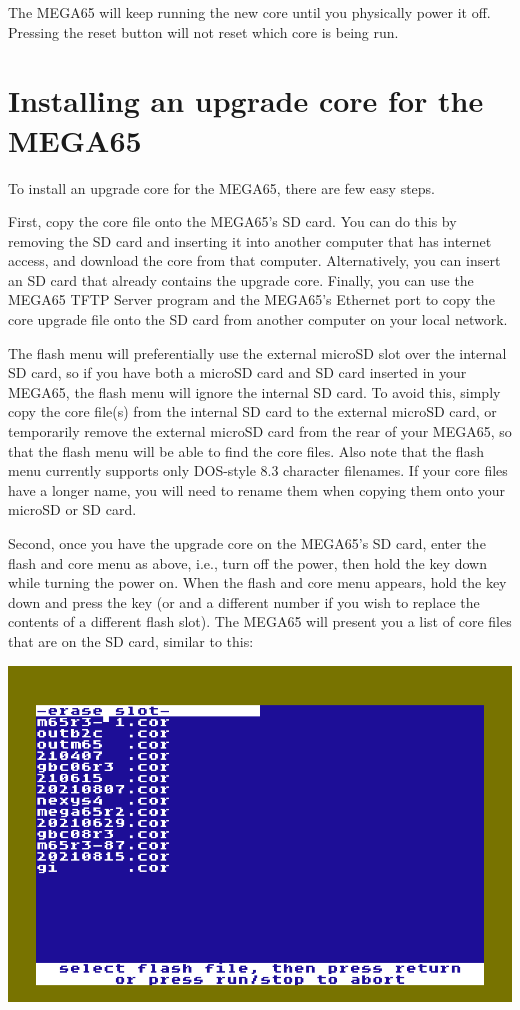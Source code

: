 The MEGA65 will keep running the new core until you physically power it off.  Pressing the reset button
will not reset which core is being run.

\section{Installing an upgrade core for the MEGA65}

To install an upgrade core for the MEGA65, there are few easy steps.

First, copy the core file onto the MEGA65's SD card.  You can do this by removing the SD card and inserting
it into another computer that has internet access, and download the core from that computer. Alternatively,
you can insert an SD card that already contains the upgrade core. Finally, you can use the MEGA65 TFTP Server
program and the MEGA65's Ethernet port to copy the core upgrade file onto the SD card from another computer
on your local network.

The flash menu will preferentially use the external microSD slot over
the internal SD card, so if you have both a microSD card and SD card
inserted in your MEGA65, the flash menu will ignore the
internal SD card. To avoid this, simply copy the core file(s) from the internal SD
card to the external microSD card, or temporarily remove the external
microSD card from the rear of your MEGA65, so that the flash menu will
be able to find the core files.  Also note that the flash menu
currently supports only DOS-style 8.3 character filenames. If your
core files have a longer name, you will need to rename them when
copying them onto your microSD or SD card.

Second, once you have the upgrade core on the MEGA65's SD card, enter the flash and core menu as above,
i.e., turn off the power, then hold the  key down while turning the power on.  When the flash
and core menu appears, hold the  key down and press the
 key (or  and a different number if you wish to replace the
contents of a different flash slot).  The MEGA65
will present you a list of core files that are on the SD card, similar
to this:

\includegraphics[width=\linewidth]{images/ss-flashmenu-selectcore.png}

